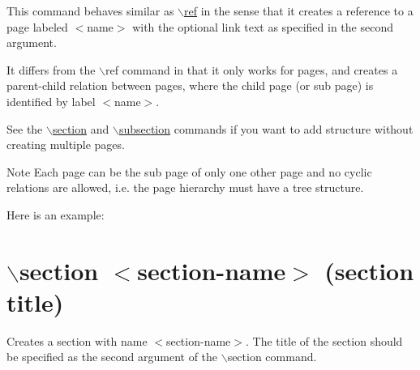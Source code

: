 This command behaves similar as \hyperlink{commands_cmdref}{$\backslash$ref} in the sense that it creates a reference to a page labeled $<$name$>$ with the optional link text as specified in the second argument.

It differs from the $\backslash$ref command in that it only works for pages, and creates a parent-\/child relation between pages, where the child page (or sub page) is identified by label $<$name$>$.

See the \hyperlink{commands_cmdsection}{$\backslash$section} and \hyperlink{commands_cmdsubsection}{$\backslash$subsection} commands if you want to add structure without creating multiple pages.

\begin{DoxyNote}{Note}
Each page can be the sub page of only one other page and no cyclic relations are allowed, i.e. the page hierarchy must have a tree structure.
\end{DoxyNote}
Here is an example: 




 \hypertarget{commands_cmdsection}{}\section{$\backslash$section $<$section-\/name$>$ (section title)}\label{commands_cmdsection}
 Creates a section with name $<$section-\/name$>$. The title of the section should be specified as the second argument of the $\backslash$section command.

